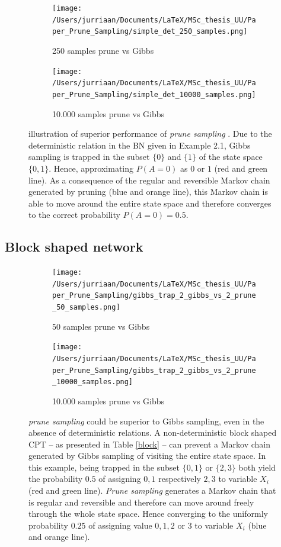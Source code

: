\documentclass[a4paper, twoside, 11pt]{report}
\theoremstyle{plain}
\theoremstyle{definition}
\theoremstyle{remark}
\newcommand{\ps}{\textit{prune sampling }}
\begin{document}
\begin{figure}[h]
\centering
\begin{subfigure}{.49\textwidth}
  \centering
  \texttt{[image: /Users/jurriaan/Documents/LaTeX/MSc\_thesis\_UU/Paper\_Prune\_Sampling/simple\_det\_250\_samples.png]}
  \caption{250 samples prune vs Gibbs}
  \label{fig:sub1}
\end{subfigure}
\begin{subfigure}{.49\textwidth}
  \centering
  \texttt{[image: /Users/jurriaan/Documents/LaTeX/MSc\_thesis\_UU/Paper\_Prune\_Sampling/simple\_det\_10000\_samples.png]}
  \caption{10.000 samples prune vs Gibbs}
  \label{fig:sub2}
\end{subfigure}
\caption{illustration of superior performance of \ps. Due to the deterministic relation in the BN given in Example 2.1, Gibbs sampling is trapped in the subset $\{0\}$ and $\{1\}$ of the state space $\{0,1\}$. Hence, approximating $P(A = 0)$ as $0$ or $1$ (red and green line). As a consequence of the regular and reversible Markov chain generated by pruning (blue and orange line), this Markov chain is able to move around the entire state space and therefore converges to the correct probability $P(A = 0) = 0.5$.}
\label{simple-deterministic}
\end{figure}

\newpage
\subsection{Block shaped network}

\begin{figure}[h]
\centering
\begin{subfigure}{.49\textwidth}
  \centering
  \texttt{[image: /Users/jurriaan/Documents/LaTeX/MSc\_thesis\_UU/Paper\_Prune\_Sampling/gibbs\_trap\_2\_gibbs\_vs\_2\_prune\_50\_samples.png]}
  \caption{50 samples prune vs Gibbs}
  \label{fig:sub1}
\end{subfigure}
\begin{subfigure}{.49\textwidth}
  \centering
  \texttt{[image: /Users/jurriaan/Documents/LaTeX/MSc\_thesis\_UU/Paper\_Prune\_Sampling/gibbs\_trap\_2\_gibbs\_vs\_2\_prune\_10000\_samples.png]}
  \caption{10.000 samples prune vs Gibbs}
  \label{fig:sub2}
\end{subfigure}
\vspace{0.75pc}
\caption{\ps could be superior to Gibbs sampling, even in the absence of deterministic relations. A non-deterministic block shaped CPT -- as presented in Table \ref{block} -- can prevent a Markov chain generated by Gibbs sampling of visiting the entire state space. In this example, being trapped in the subset $\{0, 1\}$ or $\{2, 3\}$ both yield the probability $0.5$ of assigning $0,1$ respectively $2,3$ to variable $X_i$ (red and green line). \textit{Prune sampling} generates a Markov chain that is regular and reversible and therefore can move around freely through the whole state space. Hence converging to the uniformly probability $0.25$ of assigning value $0,1,2$ or $3$ to variable $X_i$ (blue and orange line).} 
\label{block-BN}
\end{figure}
\end{document}
